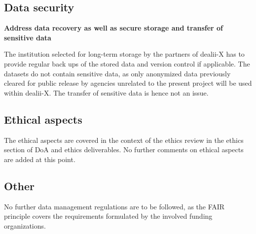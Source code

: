 \documentclass[a4paper,12pt]{article}
\begin{document}
\subsection{Data security}

\noindent \textbf{Address data recovery as well as secure storage and transfer of sensitive data}

The institution selected for long-term storage by the partners of dealii-X has to provide regular back ups of the stored data and version control if applicable. The datasets do not contain sensitive data, as only anonymized data previously cleared for public release by agencies unrelated to the present project will be used within dealii-X. The transfer of sensitive data is hence not an issue.

\subsection{Ethical aspects}

The ethical aspects are covered in the context of the ethics review in the ethics section of DoA and ethics deliverables. No further comments on ethical aspects are added at this point.

\subsection{Other}

No further data management regulations are to be followed, as the FAIR principle covers the requirements formulated by the involved funding organizations.


\label{MyLastPage}
\end{document}
